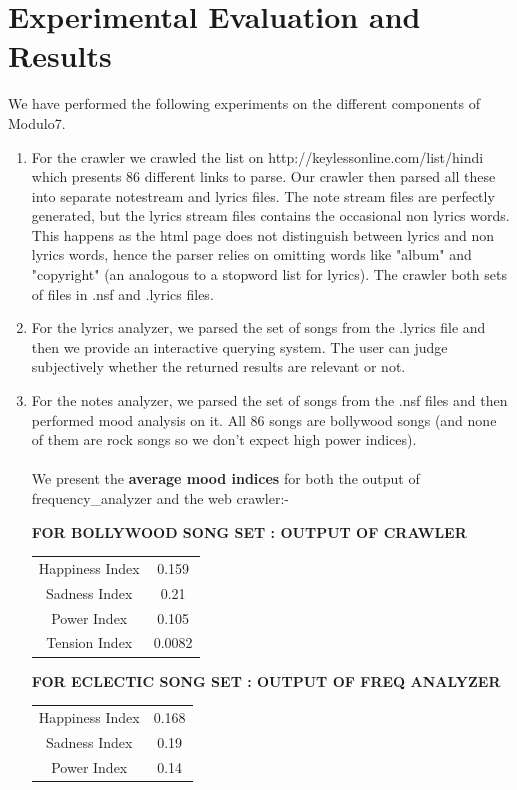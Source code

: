 \documentclass[letterpaper, 11pt]{article}
\begin{document}
\section*{Experimental Evaluation and Results}
We have performed the following experiments on the different components of Modulo7.
\begin{enumerate}
\item For the crawler we crawled the list on http://keylessonline.com/list/hindi which presents 86 different links to parse. Our crawler then parsed all these into separate notestream and lyrics files. The note stream files are perfectly generated, but the lyrics stream files contains the occasional non lyrics words. This happens as the html page does not distinguish between lyrics and non lyrics words, hence the parser relies on omitting words like "album" and "copyright" (an analogous to a stopword list for lyrics). The crawler both sets of files in .nsf and .lyrics files.
\item For the lyrics analyzer, we parsed the set of songs from the .lyrics file and then we provide an interactive querying system. The user can judge subjectively whether the returned results are relevant or not. 
\item For the notes analyzer, we parsed the set of songs from the .nsf files and then performed mood analysis on it. All 86 songs are bollywood songs (and none of them are rock songs so we don't expect high power indices). \\\\
We present the \textbf{average mood indices} for both the output of frequency\_analyzer and the web crawler:-
\begin{center}
\textbf{FOR BOLLYWOOD SONG SET : OUTPUT OF CRAWLER}
\begin{tabular}{ |c|c| } 
 \hline
 Happiness Index & 0.159 \\ 
 Sadness Index & 0.21 \\ 
 Power Index & 0.105 \\ 
 Tension Index & 0.0082\\ 
 \hline
\end{tabular}
\end{center}
\begin{center}
\textbf{FOR ECLECTIC SONG SET : OUTPUT OF FREQ ANALYZER}
\begin{tabular}{ |c|c| } 
 \hline
 Happiness Index & 0.168 \\ 
 Sadness Index & 0.19 \\ 
 Power Index & 0.14 \\ 

\end{tabular}
\end{center}
\end{enumerate}
\end{document}
